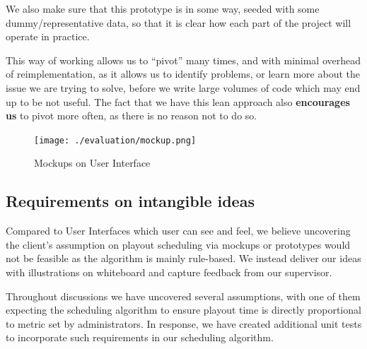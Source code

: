 \documentclass[a4paper]{article}
\begin{document}
We also make sure that this prototype is in some way, seeded with some
dummy/representative data, so that it is clear how each part of the project
will operate in practice.

This way of working allows us to ``pivot'' many times, and with minimal overhead
of reimplementation, as it allows us to identify problems, or learn more about
the issue we are trying to solve, before we write large volumes of code which
may end up to be not useful. The fact that we have this lean approach also
\textbf{encourages us} to pivot more often, as there is no reason not to do so.

\begin{figure}[H]
   \begin{center}
      \texttt{[image: ./evaluation/mockup.png]}
   \end{center}
   \caption{Mockups on User Interface}
   \label{fig:mockup}
\end{figure}

\subsection{Requirements on intangible ideas}
Compared to User Interfaces which user can see and feel, we believe 
uncovering the client's assumption on playout scheduling via mockups or 
prototypes would not be feasible as the algorithm is mainly rule-based.
We instead deliver our ideas with illustrations on whiteboard and
capture feedback from our supervisor.

Throughout discussions we have uncovered several assumptions, with one of them
expecting the scheduling algorithm to ensure playout time is 
directly proportional to metric set by administrators. In response,
we have created additional unit tests to incorporate such requirements 
in our scheduling algorithm.
\end{document}
